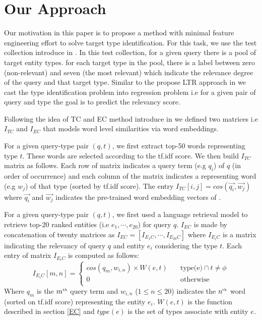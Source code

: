 \section{Our Approach}
Our motivation in this paper is to propose a method with minimal feature engineering effort to solve target type identification. For this task, we use the test collection introduce in \cite{Garigliotti:2017:TTI:3077136.3080659}. In this test collection, for a given query there is a pool of target entity types. for each target type in the pool, there is a label between zero (non-relevant) and seven (the most relevant) which indicate the relevance degree of the query and that target type. Similar to the propose LTR approach in \cite{Garigliotti:2017:TTI:3077136.3080659} we cast the type identification problem into regression problem i.e for a given pair of query and type the goal is to predict the relevancy score.

Following the idea of TC and EC method introduce in \label{key} we defined two matrices i.e $I_{TC}$ and $I_{EC}$ that models word level similarities via word embeddings. 

 For a given query-type pair $(q,t)$, we first extract top-50 words representing type $t$. These words are selected according to the tf.idf score. We then build $I_{TC}$ matrix as follows. Each row of matrix indicates a query term (e.g $q_i$) of $q$ (in order of occurrence) and each column of the matrix indicates a representing word (e.g $w_j$) of that type (sorted by tf.idf score). The entry $I_{TC}[i,j] = cos(\vec{q_i}, \vec{w_j})$ where $\vec{q_i}$ and $\vec{w_j}$ indicates the pre-trained word embedding vectors of \cite{Mikolov:2013:DRW:2999792.2999959}.

 For a given query-type pair $(q,t)$, we first used a language retrieval model to retrieve top-20 ranked entities (i.e $e_1,\cdots, e_{20}$) for query $q$. $I_{EC}$ is made by concatenation of twenty matrices as $I_{EC} = [I_{E_1C},\cdots, I_{E_{20}C}]$ where $I_{E_iC}$ is a matrix indicating the relevancy of query $q$ and entity $e_i$ considering the type $t$. Each entry of matrix $I_{E_iC}$ is computed as follows:
\begin{equation}
I_{E_iC}[m,n] = 
\begin{cases}
cos(q_m,w_{i,n}) \times W(e,t) &\quad\text{type(e)} \cap t \neq \phi \\
0 &\quad\text{otherwise} \\
\end{cases}
\end{equation}
Where $q_m$ is the $m^{\text{\tiny th}}$ query term and $w_{i,n}$ ($1\leq n \leq20$) indicates the $n^{\text{\tiny th}}$ word (sorted on tf.idf score) representing the entity $e_i$. $W(e,t)$ is the function  described in section \ref{EC} and $type(e)$ is the set of types associate with entity $e$.


